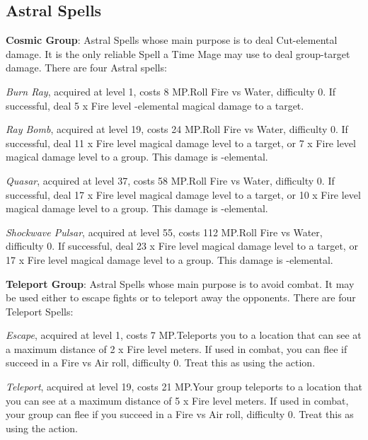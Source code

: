 \begin{multicols}{2}
    
    \subsection{Astral Spells}\label{subsec:time-astral}

    \textbf{Cosmic Group}: Astral Spells whose main purpose is to deal Cut-elemental damage. It is the only reliable Spell a Time Mage may use to deal group-target damage. There are four Astral spells:
    
    \textit{Burn Ray}, acquired at level 1, costs 8 MP.\@{}Roll Fire vs Water, difficulty 0. If successful, deal 5 x Fire level -elemental magical damage to a target.
    
    \textit{Ray Bomb}, acquired at level 19, costs 24 MP.\@{}Roll Fire vs Water, difficulty 0. If successful, deal 11 x Fire level magical damage level to a target, or 7 x Fire level magical damage level to a group. This damage is -elemental.
    
    \textit{Quasar}, acquired at level 37, costs 58 MP.\@{}Roll Fire vs Water, difficulty 0. If successful, deal 17 x Fire level magical damage level to a target, or 10 x Fire level magical damage level to a group. This damage is -elemental.
    
    \textit{Shockwave Pulsar}, acquired at level 55, costs 112 MP.\@{}Roll Fire vs Water, difficulty 0. If successful, deal 23 x Fire level magical damage level to a target, or 17 x Fire level magical damage level to a group. This damage is -elemental.
    
    \textbf{Teleport Group}: Astral Spells whose main purpose is to avoid combat. It may be used either to escape fights or to teleport away the opponents. There are four Teleport Spells:
	
    \textit{Escape}, acquired at level 1, costs 7 MP.\@{}Teleports you to a location that can see at a maximum distance of 2 x Fire level meters. If used in combat, you can flee if succeed in a Fire vs Air roll, difficulty 0. Treat this as using the  action.
    
    \textit{Teleport}, acquired at level 19, costs 21 MP.\@{}Your group teleports to a location that you can see at a maximum distance of 5 x Fire level meters. If used in combat, your group can flee if you succeed in a Fire vs Air roll, difficulty 0. Treat this as using the  action.
    

\end{multicols}
